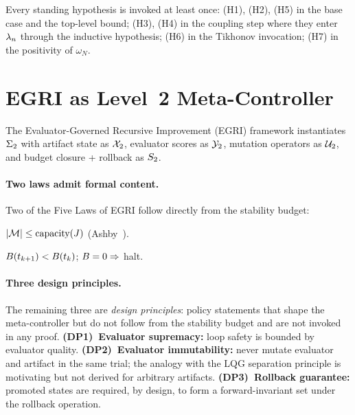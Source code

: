\documentclass[conference]{IEEEtran}
\begin{document}
\begin{remark}
\label{rem:orphan-check}
Every standing hypothesis is invoked at least once: (H1), (H2), (H5)
in the base case and the top-level bound; (H3), (H4) in the coupling
step where they enter $\lambda_n$ through the inductive hypothesis;
(H6) in the Tikhonov invocation; (H7) in the positivity of
$\omega_N$.
\end{remark}

\section{EGRI as Level~2 Meta-Controller}
\label{sec:egri}

The Evaluator-Governed Recursive Improvement (EGRI) framework instantiates
$\Sigma_2$ with artifact state as $\mathcal{X}_2$, evaluator scores as $\mathcal{Y}_2$, mutation
operators as $\mathcal{U}_2$, and budget closure + rollback as $S_2$.

\paragraph{Two laws admit formal content.}  Two of the Five Laws of
EGRI follow directly from the stability budget:
\begin{law}
\label{law:capacity}
$|\mathcal{M}| \leq \text{capacity}(J)$ (Ashby~\cite{ashby1956introduction}).
\end{law}
\begin{law}
\label{law:budget}
$B(t_{k+1}) < B(t_k)$; $B = 0 \Rightarrow$ halt.
\end{law}
\paragraph{Three design principles.}  The remaining three are
\emph{design principles}: policy statements that shape the
meta-controller but do not follow from the stability budget and are
not invoked in any proof.
\textbf{(DP1)~Evaluator supremacy:} loop safety is bounded by evaluator
quality.
\textbf{(DP2)~Evaluator immutability:} never mutate evaluator and
artifact in the same trial; the analogy with the LQG separation
principle is motivating but not derived for arbitrary artifacts.
\textbf{(DP3)~Rollback guarantee:} promoted states are required, by
design, to form a forward-invariant set under the rollback operation.
\end{document}
